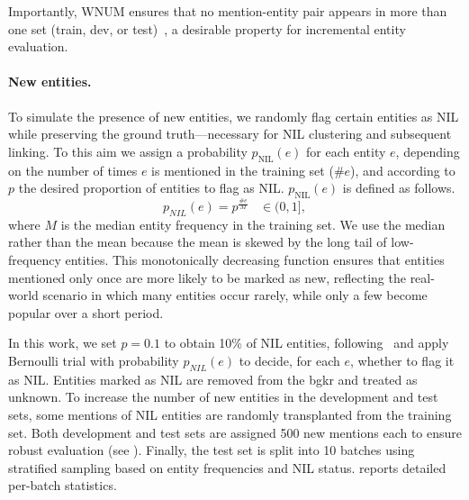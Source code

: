 Importantly, WNUM ensures that no mention-entity pair appears in more than one set (train, dev, or test)~\cite{Onoe_Durrett_2020}, a desirable property for incremental entity evaluation.

\paragraph{New entities.}
To simulate the presence of new entities, we randomly flag certain entities as NIL while preserving the ground truth---necessary for NIL clustering and subsequent linking. To this aim we assign a probability $p_\text{NIL}(e)$ for each entity $e$, depending on the number of times $e$ is mentioned in the training set ($\#e$), and according to $p$ the desired proportion of entities to flag as NIL. $p_\text{NIL}(e)$ is defined as follows.
\begin{equation}
p_{NIL}(e) = p^{\frac{\#e}{M}} \hspace{10pt} \in (0, 1],
\end{equation}
where $M$ is the median entity frequency in the training set. We use the median rather than the mean because the mean is skewed by the long tail of low-frequency entities. This monotonically decreasing function ensures that entities mentioned only once are more likely to be marked as new, reflecting the real-world scenario in which many entities occur rarely, while only a few become popular over a short period.


In this work, we set $p = 0.1$ to obtain 10\% of NIL entities, following~\cite{agarwal_2021_arborescence_arxiv} and apply Bernoulli trial with probability $p_{NIL}(e)$ to decide, for each $e$, whether to flag it as NIL. Entities marked as NIL are removed from the \ac{bgkr} and treated as unknown. To increase the number of new entities in the development and test sets, some mentions of NIL entities are randomly transplanted from the training set. Both development and test sets are assigned 500 new mentions each to ensure robust evaluation (see ).
%
Finally, the test set is split into 10 batches using stratified sampling based on entity frequencies and NIL status.  reports detailed per-batch statistics.

